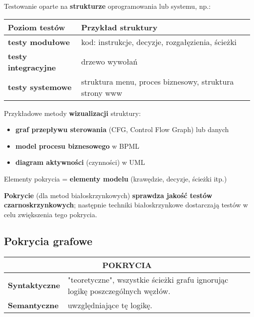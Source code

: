 \documentclass[../main.tex]{subfiles}
\begin{document}
    Testowanie oparte na \textbf{strukturze} oprogramowania lub systemu, np.:

    \begin{tabular}{p{4cm} || p{12cm}}
        \textbf{Poziom testów} & \textbf{Przykład struktury}\\
        \hline
        \hline
        \textbf{testy modułowe} & kod: instrukcje, decyzje, rozgałęzienia, ścieżki\\
        \hline
        \textbf{testy integracyjne} & drzewo wywołań\\
        \hline
        \textbf{testy systemowe} & struktura menu, proces biznesowy, struktura strony www\\
    \end{tabular}


    Przykładowe metody \textbf{wizualizacji} struktury:
    \begin{itemize}
        \item \textbf{graf przepływu sterowania} (CFG, Control Flow Graph) lub danych
        \item \textbf{model procesu biznesowego} w BPML
        \item \textbf{diagram aktywności} (czynności) w UML
    \end{itemize}
   Elementy pokrycia = \textbf{elementy modelu} (krawędzie, decyzje, ścieżki itp.)

    \textbf{Pokrycie} (dla metod białoskrzynkowych) \textbf{sprawdza jakość testów czarnoskrzynkowych}; następnie techniki
    białoskrzynkowe dostarczają testów w celu zwiększenia tego pokrycia.

    \subsection{Pokrycia grafowe}

    \begin{table}[H]
        \begin{center}
            \begin{tabular}{p{8cm} | p{8cm}}
                \multicolumn{2}{c}{\textbf{POKRYCIA}}\\
                \hline
                \textbf{Syntaktyczne} & "teoretyczne", wszystkie ścieżki grafu ignorując logikę poszczególnych węzłów.\\
                \hline
                \textbf{Semantyczne} & uwzględniające tę logikę.\\

            \end{tabular}
        \end{center}
    \end{table}
\end{document}
